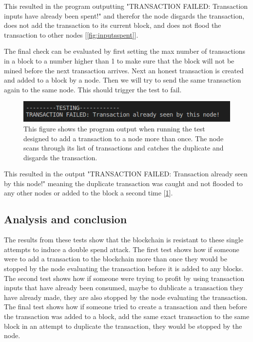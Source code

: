 \documentclass{l4proj}
\begin{document}
This resulted in the program outputting "TRANSACTION FAILED: Transaction inputs have already been spent!" and
therefor the node disgards the transaction, does not add the transaction to its current block, and does not flood
the transaction to other nodes [\ref{fig:inputsspent}].

The final check can be evaluated by first setting the max number of transactions in a block to a number higher than
1 to make sure that the block will not be mined before the next transaction arrives. Next an honest transaction is 
created and added to a block by a node. Then we will try to send the same transaction again to the same node. This
should trigger the test to fail.

\begin{figure}[!ht]
    \centering
    \includegraphics[width=1\linewidth]{images/seenbynode.png}    
    \caption
    {
        This figure shows the program output when running the test designed to add a transaction to a node more than
        once. The node scans through its list of transactions and catches the duplicate and disgards the transaction.
    }
    \label{fig:seenbynode} 
\end{figure}

This resulted in the output "TRANSACTION FAILED: Transaction already seen by this node!" meaning the duplicate
transaction was caught and not flooded to any other nodes or added to the block a second time [\ref{fig:seenbynode}].

\subsection{Analysis and conclusion}
The results from these tests show that the blockchain is resistant to these single attempts to induce a double spend
attack. The first test shows how if someone were to add a transaction to the blockchain more than once they would
be stopped by the node evaluating the transaction before it is added to any blocks. The second test shows how if
someone were trying to profit by using transaction inputs that have already been consumed, maybe to dublicate a
transaction they have already made, they are also stopped by the node evaluating the transaction. The final test
shows how if someone tried to create a transaction and then before the transaction was added to a block, add the same
exact transaction to the same block in an attempt to duplicate the transaction, they would be stopped by the node.
\end{document}

